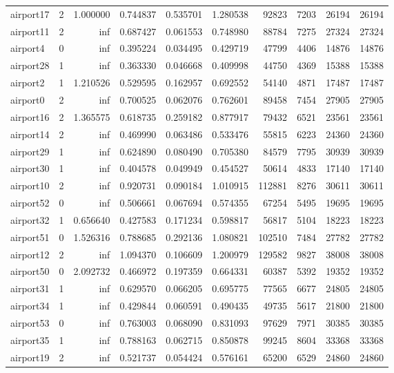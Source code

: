 \begin{longtable}{|l|r|r|r|r|r|r|r|r|r|}
airport17 & 2 & 1.000000 & 0.744837 & 0.535701 & 1.280538 & 92823 & 7203 & 26194 & 26194 \\
airport11 & 2 & inf & 0.687427 & 0.061553 & 0.748980 & 88784 & 7275 & 27324 & 27324 \\
airport4 & 0 & inf & 0.395224 & 0.034495 & 0.429719 & 47799 & 4406 & 14876 & 14876 \\
airport28 & 1 & inf & 0.363330 & 0.046668 & 0.409998 & 44750 & 4369 & 15388 & 15388 \\
airport2 & 1 & 1.210526 & 0.529595 & 0.162957 & 0.692552 & 54140 & 4871 & 17487 & 17487 \\
airport0 & 2 & inf & 0.700525 & 0.062076 & 0.762601 & 89458 & 7454 & 27905 & 27905 \\
airport16 & 2 & 1.365575 & 0.618735 & 0.259182 & 0.877917 & 79432 & 6521 & 23561 & 23561 \\
airport14 & 2 & inf & 0.469990 & 0.063486 & 0.533476 & 55815 & 6223 & 24360 & 24360 \\
airport29 & 1 & inf & 0.624890 & 0.080490 & 0.705380 & 84579 & 7795 & 30939 & 30939 \\
airport30 & 1 & inf & 0.404578 & 0.049949 & 0.454527 & 50614 & 4833 & 17140 & 17140 \\
airport10 & 2 & inf & 0.920731 & 0.090184 & 1.010915 & 112881 & 8276 & 30611 & 30611 \\
airport52 & 0 & inf & 0.506661 & 0.067694 & 0.574355 & 67254 & 5495 & 19695 & 19695 \\
airport32 & 1 & 0.656640 & 0.427583 & 0.171234 & 0.598817 & 56817 & 5104 & 18223 & 18223 \\
airport51 & 0 & 1.526316 & 0.788685 & 0.292136 & 1.080821 & 102510 & 7484 & 27782 & 27782 \\
airport12 & 2 & inf & 1.094370 & 0.106609 & 1.200979 & 129582 & 9827 & 38008 & 38008 \\
airport50 & 0 & 2.092732 & 0.466972 & 0.197359 & 0.664331 & 60387 & 5392 & 19352 & 19352 \\
airport31 & 1 & inf & 0.629570 & 0.066205 & 0.695775 & 77565 & 6677 & 24805 & 24805 \\
airport34 & 1 & inf & 0.429844 & 0.060591 & 0.490435 & 49735 & 5617 & 21800 & 21800 \\
airport53 & 0 & inf & 0.763003 & 0.068090 & 0.831093 & 97629 & 7971 & 30385 & 30385 \\
airport35 & 1 & inf & 0.788163 & 0.062715 & 0.850878 & 99245 & 8604 & 33368 & 33368 \\
airport19 & 2 & inf & 0.521737 & 0.054424 & 0.576161 & 65200 & 6529 & 24860 & 24860 \\

\end{longtable}

